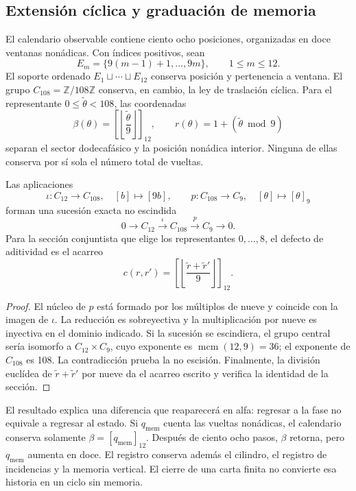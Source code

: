 

\subsection{Extensión cíclica y graduación de memoria}
\label{x_reciprocidad:subsec:k-calendario}

El calendario observable contiene ciento ocho posiciones, organizadas en
doce ventanas nonádicas. Con índices positivos, sean
\[
 E_m=\{9(m-1)+1,\ldots,9m\},\qquad 1\leq m\leq12.
\]
El soporte ordenado \(E_1\sqcup\cdots\sqcup E_{12}\) conserva posición y
pertenencia a ventana. El grupo \(C_{108}=\mathbb Z/108\mathbb Z\)
conserva, en cambio, la ley de traslación cíclica. Para el representante
\(0\leq\widetilde\theta<108\), las coordenadas
\[
 \beta(\theta)=\left[\left\lfloor\frac{\widetilde\theta}{9}\right\rfloor\right]_{12},
 \qquad r(\theta)=1+(\widetilde\theta\bmod9)
\]
separan el sector dodecafásico y la posición nonádica interior. Ninguna de
ellas conserva por sí sola el número total de vueltas.

\begin{proposition}
\label{x_reciprocidad:prop:k-extension}
Las aplicaciones
\[
 \iota:C_{12}\longrightarrow C_{108},\quad[b]\longmapsto[9b],
 \qquad p:C_{108}\longrightarrow C_9,\quad[\theta]\longmapsto[\theta]_9
\]
forman una sucesión exacta no escindida
\[
 0\longrightarrow C_{12}\xrightarrow{\iota}C_{108}
 \xrightarrow{p}C_9\longrightarrow0.
\]
Para la sección conjuntista que elige los representantes
\(0,\ldots,8\), el defecto de aditividad es el acarreo
\[
 c(r,r')=\left[\left\lfloor\frac{\widetilde r+\widetilde r'}9\right\rfloor\right]_{12}.
\]
\end{proposition}

\begin{proof}
El núcleo de \(p\) está formado por los múltiplos de nueve y coincide con
la imagen de \(\iota\). La reducción es sobreyectiva y la multiplicación
por nueve es inyectiva en el dominio indicado. Si la sucesión se
escindiera, el grupo central sería isomorfo a \(C_{12}\times C_9\), cuyo
exponente es \(\operatorname{mcm}(12,9)=36\); el exponente de
\(C_{108}\) es 108. La contradicción prueba la no escisión. Finalmente,
la división euclídea de \(\widetilde r+\widetilde r'\) por nueve da el
acarreo escrito y verifica la identidad de la sección.
\end{proof}

El resultado explica una diferencia que reaparecerá en alfa: regresar a la
fase no equivale a regresar al estado. Si \(q_{\mathrm{mem}}\) cuenta las
vueltas nonádicas, el calendario conserva solamente
\(\beta=[q_{\mathrm{mem}}]_{12}\). Después de ciento ocho pasos,
\(\beta\) retorna, pero \(q_{\mathrm{mem}}\) aumenta en doce. El
registro conserva además el cilindro, el registro de incidencias y la memoria
vertical. El cierre de una carta finita no convierte esa historia en un
ciclo sin memoria.

